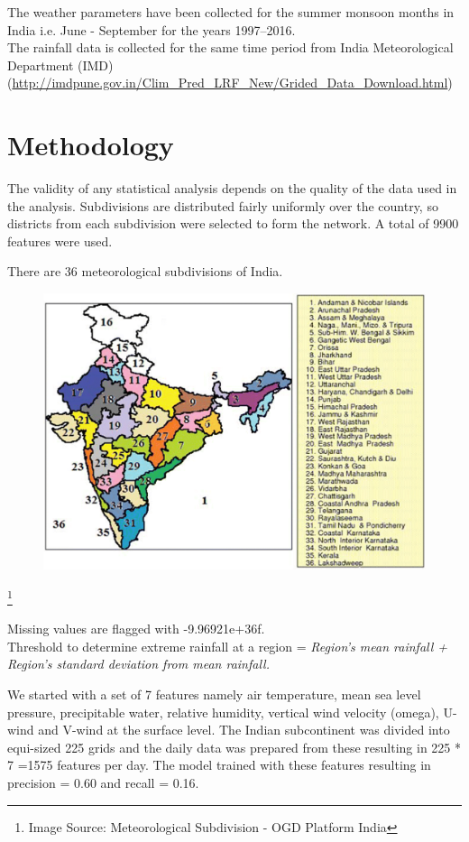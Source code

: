 \documentclass[11pt,a4paper]{article}
\begin{document}
The weather parameters have been collected for the summer monsoon months in India i.e. June - September for the years 1997–2016.\\

The rainfall data is collected for the same time period from India Meteorological Department (IMD) (\url{http://imdpune.gov.in/Clim_Pred_LRF_New/Grided_Data_Download.html})

\section{Methodology}
The validity of any statistical analysis depends on the quality of the data used in the analysis. Subdivisions are distributed fairly uniformly over the country, so  districts from each subdivision were selected to form the network. A total of 9900 features were used. 

There are 36 meteorological subdivisions of India.
\begin{figure}[!h]
\includegraphics[scale=0.2]{Fig1.png}
\caption{}
\end{figure}
\footnote{\small Image Source: Meteorological Subdivision - OGD Platform India}

Missing values are flagged with -9.96921e+36f. \\

Threshold to determine extreme rainfall at a region = \textit{Region's mean rainfall + Region's standard deviation from mean rainfall.}

\medskip

We started with a set of 7 features namely air temperature, mean sea level pressure, precipitable water, relative humidity, vertical wind velocity (omega), U-wind and V-wind at the surface level.  The Indian subcontinent was divided into equi-sized 225 grids and the daily data was prepared from these resulting in 225 * 7 =1575 features per day. The model trained with these features 
resulting in precision = 0.60 and recall = 0.16. \\
\end{document}
